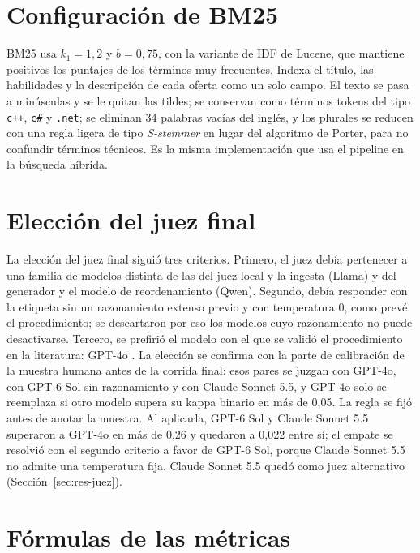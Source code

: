 \section{Configuración de BM25}
\label{anx:bm25}

BM25 \citep{Robertson2009} usa $k_1 = 1{,}2$ y $b = 0{,}75$, con la variante de IDF de Lucene, que mantiene positivos los puntajes de los términos muy frecuentes. Indexa el título, las habilidades y la descripción de cada oferta como un solo campo. El texto se pasa a minúsculas y se le quitan las tildes; se conservan como términos tokens del tipo \texttt{c++}, \texttt{c\#} y \texttt{.net}; se eliminan 34 palabras vacías del inglés, y los plurales se reducen con una regla ligera de tipo \textit{S-stemmer} en lugar del algoritmo de Porter, para no confundir términos técnicos. Es la misma implementación que usa el pipeline en la búsqueda híbrida.

\section{Elección del juez final}
\label{anx:juez-final}

La elección del juez final siguió tres criterios. Primero, el juez debía pertenecer a una familia de modelos distinta de las del juez local y la ingesta (Llama) y del generador y el modelo de reordenamiento (Qwen). Segundo, debía responder con la etiqueta sin un razonamiento extenso previo y con temperatura 0, como prevé el procedimiento; se descartaron por eso los modelos cuyo razonamiento no puede desactivarse. Tercero, se prefirió el modelo con el que se validó el procedimiento en la literatura: GPT-4o \citep{Upadhyay2024}. La elección se confirma con la parte de calibración de la muestra humana antes de la corrida final: esos pares se juzgan con GPT-4o, con GPT-6 Sol sin razonamiento y con Claude Sonnet 5.5, y GPT-4o solo se reemplaza si otro modelo supera su kappa binario en más de 0,05. La regla se fijó antes de anotar la muestra. Al aplicarla, GPT-6 Sol y Claude Sonnet 5.5 superaron a GPT-4o en más de 0,26 y quedaron a 0,022 entre sí; el empate se resolvió con el segundo criterio a favor de GPT-6 Sol, porque Claude Sonnet 5.5 no admite una temperatura fija. Claude Sonnet 5.5 quedó como juez alternativo (Sección~\ref{sec:res-juez}).

\section{Fórmulas de las métricas}
\label{anx:formulas}

